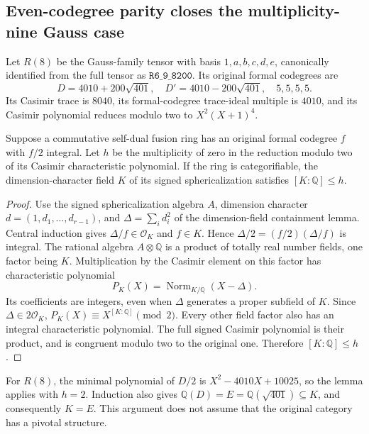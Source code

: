 \subsection{Even-codegree parity closes the multiplicity-nine Gauss case}
\label{subsec:gauss-eight-general}
Let $R(8)$ be the Gauss-family tensor with basis $1,a,b,c,d,e$,
canonically identified from the full tensor as $\texttt{R6\_9\_8200}$.
Its original formal codegrees are
\[
D=4010+200\sqrt{401},\quad D'=4010-200\sqrt{401},\quad5,5,5,5.
\]
Its Casimir trace is $8040$, its formal-codegree trace-ideal multiple is
$4010$, and its Casimir polynomial reduces modulo two to
$X^2(X+1)^4$.

\begin{lemma}
Suppose a commutative self-dual fusion ring has an original formal codegree
$f$ with $f/2$ integral. Let $h$ be the multiplicity of zero in the reduction
modulo two of its Casimir characteristic polynomial. If the ring is
categorifiable, the dimension-character field $K$ of its signed
sphericalization satisfies $[K:\mathbb Q]\le h$.
\end{lemma}
\begin{proof}
Use the signed sphericalization algebra $A$, dimension character
$d=(1,d_1,\ldots,d_{r-1})$, and $\Delta=\sum_i d_i^2$ of the
dimension-field containment lemma. Central induction gives
$\Delta/f\in\mathcal O_K$ and $f\in K$. Hence
$\Delta/2=(f/2)(\Delta/f)$ is integral.
The rational algebra $A\otimes\mathbb Q$ is a product of totally real
number fields, one factor being $K$. Multiplication by the Casimir element
on this factor has characteristic polynomial
\[
P_K(X)=\operatorname{Norm}_{K/\mathbb Q}(X-\Delta).
\]
Its coefficients are integers, even when $\Delta$ generates a proper
subfield of $K$. Since $\Delta\in2\mathcal O_K$,
$P_K(X)\equiv X^{[K:\mathbb Q]}\pmod2$.
Every other field factor also has an integral characteristic polynomial.
The full signed Casimir polynomial is their product, and is congruent
modulo two to the original one. Therefore $[K:\mathbb Q]\le h$.
\end{proof}

For $R(8)$, the minimal polynomial of $D/2$ is
$X^2-4010X+10025$, so the lemma applies with $h=2$.
Induction also gives $\mathbb Q(D)=E=\mathbb Q(\sqrt{401})\subseteq K$,
and consequently $K=E$. This argument does not assume that the original
category has a pivotal structure.

